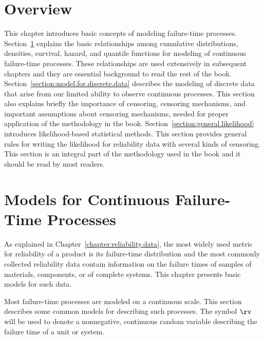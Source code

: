 \section*{Overview}
This chapter introduces basic concepts of modeling failure-time
processes.  Section~\ref{section:cont.time.proc} explains the basic
relationships among cumulative distributions, densities, survival,
hazard, and quantile functions for modeling of continuous
failure-time processes.  These relationships are used extensively
in subsequent chapters and they are essential background to read the
rest of the book.  Section~\ref{section:model.for.discrete.data}
describes the modeling of discrete data that arise from our limited
ability to observe continuous processes. This section also explains
briefly the importance of censoring, censoring mechanisms, and
important assumptions about censoring mechanisms, needed for proper
application of the methodology in the book.
Section~\ref{section:general.likelihood} introduces likelihood-based
statistical methods. This section provides
general rules for writing the likelihood for reliability data with
several kinds of censoring.  This section is an integral part of the
methodology used in the book and it should be read by most readers.


\section{Models for Continuous Failure-Time Processes}
\label{section:cont.time.proc}

As explained in Chapter~\ref{chapter:reliability.data}, the most
widely used metric for reliability of a product is its failure-time
distribution and the most commonly collected reliability data
contain information on the failure times of samples of materials,
components, or of complete systems. This chapter presents basic
models for such data.

Most failure-time processes are modeled on a continuous scale.  This
section describes some common models for describing such processes.
The symbol $\rv$ will be used to denote a nonnegative, continuous
random variable describing the failure time of a unit or system.

